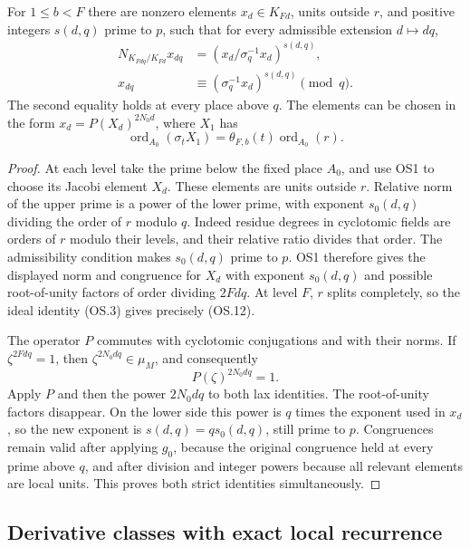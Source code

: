 \begin{proposition}
For $1\le b<F$ there are nonzero elements $x_d\in K_{Fd}$,
units outside $r$, and positive integers $s(d,q)$ prime to $p$,
such that for every admissible extension $d\mapsto dq$,
\begin{align*}
 N_{K_{Fdq}/K_{Fd}}x_{dq}
       &=(x_d/\sigma_q^{-1}x_d)^{s(d,q)},\\
 x_{dq}&\equiv(\sigma_q^{-1}x_d)^{s(d,q)}\pmod q.
\end{align*}
The second equality holds at every place above $q$.
The elements can be chosen in the form
$x_d=P(X_d)^{2N_0d}$, where $X_1$ has
\[
 \operatorname{ord}_{A_0}(\sigma_tX_1)
                 =\theta_{F,b}(t)\operatorname{ord}_{A_0}(r).
 \tag{OS.12}
\]
\end{proposition}
\begin{proof}
At each level take the prime below the fixed place $A_0$, and use OS1
to choose its Jacobi element $X_d$.  These elements are units outside
$r$.  Relative norm of the upper prime is a power of the lower
prime, with exponent $s_0(d,q)$ dividing the order of $r$ modulo $q$.
Indeed residue degrees in cyclotomic fields are orders of $r$ modulo
their levels, and their relative ratio divides that order.  The
admissibility condition makes $s_0(d,q)$ prime to $p$.
OS1 therefore gives the displayed norm and congruence for $X_d$
with exponent $s_0(d,q)$ and possible root-of-unity factors of order
dividing $2Fdq$.  At level $F$, $r$ splits completely, so the ideal
identity (OS.3) gives precisely (OS.12).

The operator $P$ commutes with cyclotomic conjugations and with their
norms.  If $\zeta^{2Fdq}=1$, then
$\zeta^{2N_0dq}\in\mu_M$, and consequently
\[
                     P(\zeta)^{2N_0dq}=1.
\]
Apply $P$ and then the power $2N_0dq$ to both lax identities.
The root-of-unity factors disappear.  On the lower side this power
is $q$ times the exponent used in $x_d$, so the new exponent is
$s(d,q)=q s_0(d,q)$, still prime to $p$.
Congruences remain valid after applying $g_0$, because the original
congruence held at every prime above $q$, and after division and
integer powers because all relevant elements are local units.
This proves both strict identities simultaneously.
\end{proof}

\subsection{Derivative classes with exact local recurrence}

